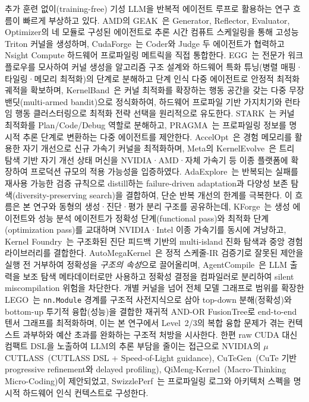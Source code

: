 \documentclass[sigplan,screen,review,anonymous]{acmart}
\begin{document}
추가 훈련 없이(training-free) 기성 LLM을 반복적 에이전트 루프로 활용하는
연구 흐름이 빠르게 부상하고 있다.
AMD의 GEAK~\cite{wang2025geak}은 Generator, Reflector, Evaluator, Optimizer의
네 모듈로 구성된 에이전트로 추론 시간 컴퓨트 스케일링을 통해
고성능 Triton 커널을 생성하며,
CudaForge~\cite{cudaforge2025}는 Coder와 Judge 두 에이전트가 협력하고
Nsight Compute 하드웨어 프로파일링 메트릭을 직접 통합한다.
EGG~\cite{egg2026}는 전문가 워크플로우를 모사하여 커널 생성을 알고리즘 구조 설계와
하드웨어 특화 튜닝(병렬 매핑·타일링·메모리 최적화)의 단계로 분해하고
단계 인식 다중 에이전트로 안정적 최적화 궤적을 확보하며,
KernelBand~\cite{kernelband2026}은 커널 최적화를 확장하는 행동 공간을 갖는
다중 무장 밴딧(multi-armed bandit)으로 정식화하여, 하드웨어 프로파일 기반 가지치기와
런타임 행동 클러스터링으로 최적화 전략 선택을 원리적으로 유도한다.
STARK~\cite{stark2026}는 커널 최적화를 Plan/Code/Debug 역할로 분해하고,
PRAGMA~\cite{lei2025pragma}는 프로파일링 정보를 명시적 추론 단계로 변환하는
다중 에이전트를 제안한다.
AccelOpt~\cite{accelopt2025}은 경험 메모리를 활용한 자기 개선으로
신규 가속기 커널을 최적화하며, Meta의 KernelEvolve~\cite{liao2026kernelevolve}은
트리 탐색 기반 자기 개선 상태 머신을 NVIDIA·AMD·자체 가속기 등
이종 플랫폼에 확장하여 프로덕션 규모의 적용 가능성을 입증하였다.
AdaExplore~\cite{du2026adaexplore}는 반복되는 실패를 재사용 가능한 검증 규칙으로
distill하는 failure-driven adaptation과 다양성 보존 탐색(diversity-preserving search)을
결합하여, 단순 반복 개선의 한계를 극복한다.
이 흐름은 본 연구와 동형의 생성·진단·평가 분리 구조를 공유하는데,
KForge~\cite{sereda2026kforge}는 생성 에이전트와 성능 분석 에이전트가
정확성 단계(functional pass)와 최적화 단계(optimization pass)를 교대하며
NVIDIA·Intel 이종 가속기를 동시에 겨냥하고,
Kernel Foundry~\cite{huang2026kernelfoundry}는 구조화된 진단 피드백 기반의
multi-island 진화 탐색과 중앙 경험 라이브러리를 결합한다.
AutoMegaKernel~\cite{jaber2026automegakernel}은 정적 스케줄-IR 검증기로
잘못된 제안을 실행 전 거부하여 정확성을 \emph{구조의 속성}으로 끌어올리며,
AgentCompile~\cite{li2026agentcompile}은 LLM 출력을 보조 탐색 메타데이터로만 사용하고
정확성 결정을 컴파일러로 분리하여 silent miscompilation 위험을 차단한다.
개별 커널을 넘어 전체 모델 그래프로 범위를 확장한 LEGO~\cite{lego2026}는
\texttt{nn.Module} 경계를 구조적 사전지식으로 삼아 top-down 분해(정확성)와
bottom-up 투기적 융합(성능)을 결합한 재귀적 AND-OR FusionTree로
end-to-end 텐서 그래프를 최적화하며, 이는 본 연구에서 Level~2/3의 복합 융합 문제가
겪는 컨텍스트 과부하와 예산 초과를 완화하는 구조적 처방을 시사한다.
한편 raw CUDA 대신 컴팩트 DSL을 노출하여 LLM의 추론 부담을 줄이는 접근으로
NVIDIA의 $\mu$CUTLASS~\cite{hari2026ucutlass}(CUTLASS DSL + Speed-of-Light guidance),
CuTeGen~\cite{saba2026cutegen}(CuTe 기반 progressive refinement와 delayed profiling),
QiMeng-Kernel~\cite{qimengkernel2026}(Macro-Thinking Micro-Coding)이 제안되었고,
SwizzlePerf~\cite{swizzleperf2025}는 프로파일링 로그와 아키텍처 스펙을
명시적 하드웨어 인식 컨텍스트로 구성한다.
\end{document}
